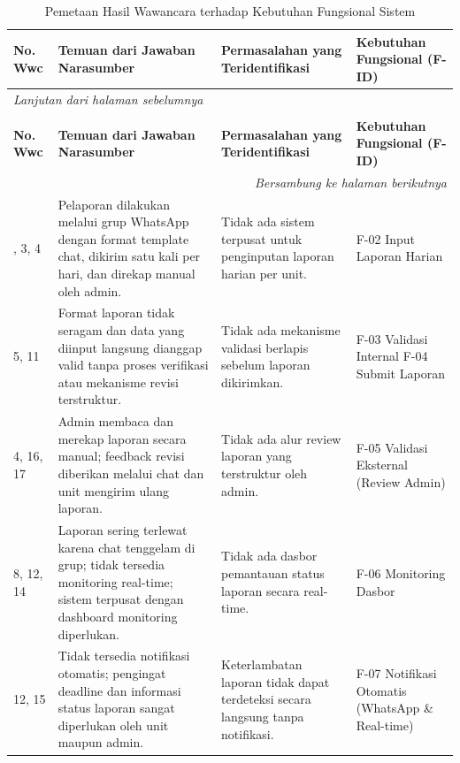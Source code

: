 \begin{longtable}{|p{}|p{}|p{}|p{}|}
    \caption{Pemetaan Hasil Wawancara terhadap Kebutuhan Fungsional Sistem}
    \label{table:3.pemetaan-wawancara}\\
    \hline
    \textbf{No. Wwc} & \textbf{Temuan dari Jawaban Narasumber} & \textbf{Permasalahan yang Teridentifikasi} & \textbf{Kebutuhan Fungsional (F-ID)} \\
    \hline
    \endfirsthead
    \multicolumn{4}{l}{\textit{Lanjutan dari halaman sebelumnya}} \\
    \caption[]{Pemetaan Hasil Wawancara terhadap Kebutuhan Fungsional Sistem} \\
    \hline
    \textbf{No. Wwc} & \textbf{Temuan dari Jawaban Narasumber} & \textbf{Permasalahan yang Teridentifikasi} & \textbf{Kebutuhan Fungsional (F-ID)} \\
    \hline
    \endhead
    \hline
    \multicolumn{4}{r}{\textit{Bersambung ke halaman berikutnya}} \\
    \endfoot
    \endlastfoot
    2, 3, 4 & Pelaporan dilakukan melalui grup WhatsApp dengan format template chat, dikirim satu kali per hari, dan direkap manual oleh admin. & Tidak ada sistem terpusat untuk penginputan laporan harian per unit. & F-02 Input Laporan Harian \\
    \hline
    5, 11 & Format laporan tidak seragam dan data yang diinput langsung dianggap valid tanpa proses verifikasi atau mekanisme revisi terstruktur. & Tidak ada mekanisme validasi berlapis sebelum laporan dikirimkan. & F-03 Validasi Internal \newline F-04 Submit Laporan \\
    \hline
    4, 16, 17 & Admin membaca dan merekap laporan secara manual; feedback revisi diberikan melalui chat dan unit mengirim ulang laporan. & Tidak ada alur review laporan yang terstruktur oleh admin. & F-05 Validasi Eksternal (Review Admin) \\
    \hline
    8, 12, 14 & Laporan sering terlewat karena chat tenggelam di grup; tidak tersedia monitoring real-time; sistem terpusat dengan dashboard monitoring diperlukan. & Tidak ada dasbor pemantauan status laporan secara real-time. & F-06 Monitoring Dasbor \\
    \hline
    12, 15 & Tidak tersedia notifikasi otomatis; pengingat deadline dan informasi status laporan sangat diperlukan oleh unit maupun admin. & Keterlambatan laporan tidak dapat terdeteksi secara langsung tanpa notifikasi. & F-07 Notifikasi Otomatis (WhatsApp \& Real-time) \\

\end{longtable}

